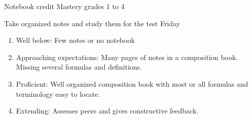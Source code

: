 \begin{frame}{Notebook credit}
{Mastery grades 1 to 4}
\begin{block}{Take organized notes and study them for the test Friday}
    \begin{enumerate}
      \item Well below: Few notes or no notebook
      \item Approaching expectations: Many pages of notes in a composition book. Missing several formulas and definitions.
      \item Proficient: Well organized composition book with most or all formulas and terminology easy to locate.
      \item Extending: Assesses peers and gives constructive feedback.
      \end{enumerate}
    \end{block}
    \end{frame}

  